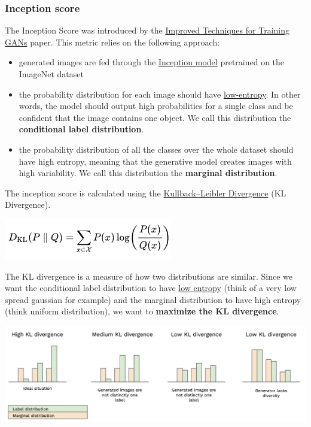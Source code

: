 \subsubsection{Inception score}

The Inception Score was introduced by the
\href{https://arxiv.org/pdf/1606.03498.pdf}{Improved Techniques for
Training GANs} paper. This metric relies on the following approach: 
\begin{itemize}
    \item generated images are fed through the \href{https://arxiv.org/pdf/1409.4842.pdf}{Inception model} pretrained on the ImageNet dataset
    \item the probability distribution for each image should have \href{https://en.wikipedia.org/wiki/Entropy_(information_theory)}{low-entropy}. In other words, the model should output high probabilities for a single class and be confident that the image contains one object. We call this distribution the \textbf{conditional label distribution}.
    \item the probability distribution of all the classes over the whole dataset should have high entropy, meaning that the generative model creates images with high variability. We call this distribution the \textbf{marginal distribution}.
\end{itemize}
The inception score is calculated using the
\href{https://en.wikipedia.org/wiki/Kullback\%E2\%80\%93Leibler_divergence}{Kullback--Leibler
Divergence} (KL Divergence).

\includegraphics[width=1\linewidth]{img//genAdvNet//deepGAN/kl_divergence.png}

The KL divergence is a measure of how two distributions are similar.
Since we want the conditional label distribution to have
\href{https://en.wikipedia.org/wiki/Entropy_(information_theory)}{low
entropy} (think of a very low spread gaussian for example) and the
marginal distribution to have high entropy (think uniform distribution),
we want to \textbf{maximize the KL divergence}.

\includegraphics[width=1\linewidth]{img//genAdvNet//deepGAN/fid_score.png}

